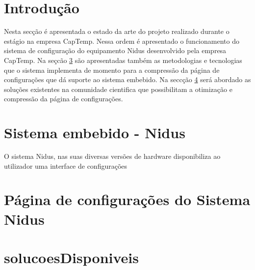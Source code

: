 
\section{Introdução}
Nesta secção é apresentada o estado da arte do projeto realizado durante o estágio na empresa CapTemp. Nessa ordem é apresentado o funcionamento do sistema de configuração do equipamento Nidus desenvolvido pela empresa CapTemp. Na seçcão \ref{Página de configurações do Sistema Nidus} são apresentadas também as metodologias e tecnologias que o sistema implementa de momento para a compressão da página de configurações que dá suporte ao sistema embebido. Na seccção \ref{solucoesDisponiveis} será abordado as soluções existentes na comunidade cientifica que possibilitam a otimização e compressão da página de configurações.

\section{Sistema embebido - Nidus} \label{Sistema embebido - Nidus}
 O sistema Nidus, nas suas diversas versões de hardware disponibiliza ao utilizador uma interface   de configurações
\section{Página de configurações do Sistema Nidus} \label{Página de configurações do Sistema Nidus}
\section{solucoesDisponiveis} \label{solucoesDisponiveis}












